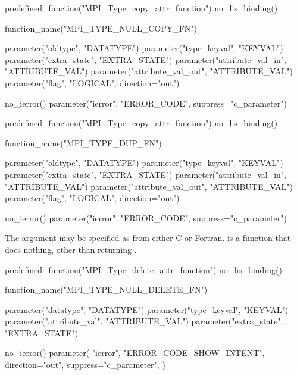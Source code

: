 \begin{mpi-binding}
    predefined_function("MPI_Type_copy_attr_function")
    no_lis_binding()
    
    function_name("MPI_TYPE_NULL_COPY_FN")
    
    parameter("oldtype", "DATATYPE")
    parameter("type_keyval", "KEYVAL")
    parameter("extra_state", "EXTRA_STATE")
    parameter("attribute_val_in", "ATTRIBUTE_VAL")
    parameter("attribute_val_out", "ATTRIBUTE_VAL")
    parameter("flag", "LOGICAL", direction="out")
    
    no_ierror()
    parameter("ierror", "ERROR_CODE", suppress="c_parameter")
\end{mpi-binding}

\begin{mpi-binding}
    predefined_function("MPI_Type_copy_attr_function")
    no_lis_binding()
    
    function_name("MPI_TYPE_DUP_FN")
    
    parameter("oldtype", "DATATYPE")
    parameter("type_keyval", "KEYVAL")
    parameter("extra_state", "EXTRA_STATE")
    parameter("attribute_val_in", "ATTRIBUTE_VAL")
    parameter("attribute_val_out", "ATTRIBUTE_VAL")
    parameter("flag", "LOGICAL", direction="out")
    
    no_ierror()
    parameter("ierror", "ERROR_CODE", suppress="c_parameter")
\end{mpi-binding}

The argument  may be specified as
from either C or Fortran.
 is a function that does nothing, other
than returning . 

\begin{mpi-binding}
    predefined_function("MPI_Type_delete_attr_function")
    no_lis_binding()
    
    function_name("MPI_TYPE_NULL_DELETE_FN")
    
    parameter("datatype", "DATATYPE")
    parameter("type_keyval", "KEYVAL")
    parameter("attribute_val", "ATTRIBUTE_VAL")
    parameter("extra_state", "EXTRA_STATE")
    
    no_ierror()
    parameter(
        "ierror",
        "ERROR_CODE_SHOW_INTENT",
        direction="out",
        suppress="c_parameter",
    )
\end{mpi-binding}

